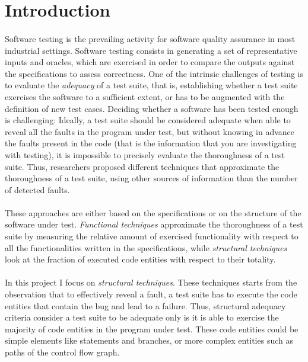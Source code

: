 \section{Introduction}\label{introduction}

\paragraph{}
Software testing is the prevailing activity for software quality assurance in 
most industrial settings. Software testing consists in generating a set of representative inputs 
and oracles, which are exercised in order to compare the outputs against the specifications to assess 
correctness. 
One of the intrinsic challenges of testing is to evaluate the \textit{adequacy} 
of a test suite, that is, establishing whether a test suite exercises 
the software to a sufficient extent, or has to be augmented with the 
definition of new test cases. Deciding whether a software has been tested enough is challenging: Ideally, a test suite should be 
considered adequate when able to reveal all the faults in the program 
under test, but without knowing in advance the faults present in the 
code (that is the information that you are investigating with testing), it is impossible to precisely evaluate the thoroughness of a test suite. 
Thus, researchers proposed different techniques that approximate the 
thoroughness of a test suite, using other sources of information than the number of detected faults.

\paragraph{}
These approaches are either based on the specifications or on the 
structure of the software under test. \textit{Functional techniques} 
approximate the thoroughness of a test suite by measuring the relative 
amount of exercised functionality with respect to all the 
functionalities written in the specifications, while \textit{structural 
techniques} look at the fraction of executed code entities with respect 
to their totality. 

\paragraph{}
In this project I focus on \textit{structural techniques}. These techniques starts from the observation that to effectively reveal a 
fault, a test suite has to execute the code entities that contain the bug and lead to a failure. 
Thus, structural adequacy criteria consider a test suite to be adequate only is it is able to exercise the majority of 
code entities in the program under test. These code entities could be 
simple elements like statements and branches, or more complex entities 
such as paths of the control flow graph. 

